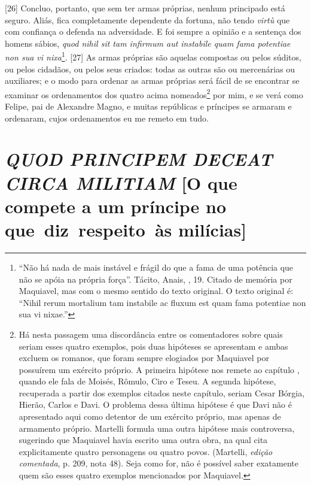 {[}26{]} Concluo, portanto, que sem ter armas próprias, nenhum
principado está seguro. Aliás, fica completamente dependente da fortuna,
não tendo \emph{virtù} que com confiança o defenda na adversidade. E foi
sempre a opinião e a sentença dos homens sábios, \emph{quod nihil sit
tam infirmum aut instabile quam fama potentiae non sua vi
nixa}\footnote{``Não há nada de mais instável e frágil do que a fama de
  uma potência que não se apóia na própria força''. Tácito, Anais, ,
  19. Citado de memória por Maquiavel, mas com o mesmo sentido do texto
  original. O texto original é: ``Nihil rerum mortalium tam instabile ac
  fluxum est quam fama potentiae non sua vi nixae.''}. {[}27{]} As armas
próprias são aquelas compostas ou pelos súditos, ou pelos cidadãos, ou
pelos seus criados: todas as outras são ou mercenárias ou auxiliares; e
o modo para ordenar as armas próprias será fácil de se encontrar se
examinar os ordenamentos dos quatro acima nomeados\footnote{Há nesta
  passagem uma discordância entre os comentadores sobre quais seriam
  esses quatro exemplos, pois duas hipóteses se apresentam e ambas
  excluem os romanos, que foram sempre elogiados por Maquiavel por
  possuírem um exército próprio. A primeira hipótese nos remete ao
  capítulo , quando ele fala de Moisés, Rômulo, Ciro e Teseu. A
  segunda hipótese, recuperada a partir dos exemplos citados neste
  capítulo, seriam Cesar Bórgia, Hierão, Carlos  e Davi. O problema
  dessa última hipótese é que Davi não é apresentado aqui como detentor
  de um exército próprio, mas apenas de armamento próprio. Martelli
  formula uma outra hipótese mais controversa, sugerindo que Maquiavel
  havia escrito uma outra obra, na qual cita explicitamente quatro
  personagens ou quatro povos. (Martelli, \emph{edição comentada}, p.
  209, nota 48). Seja como for, não é possível saber exatamente quem são
  esses quatro exemplos mencionados por Maquiavel.} por mim, e se verá
como Felipe, pai de Alexandre Magno, e muitas repúblicas e príncipes se
armaram e ordenaram, cujos ordenamentos eu me remeto em tudo.

\quebra\section{\emph{QUOD PRINCIPEM DECEAT CIRCA MILITIAM}\break
{[}O que compete a um príncipe no que~diz~respeito~às milícias{]}}

